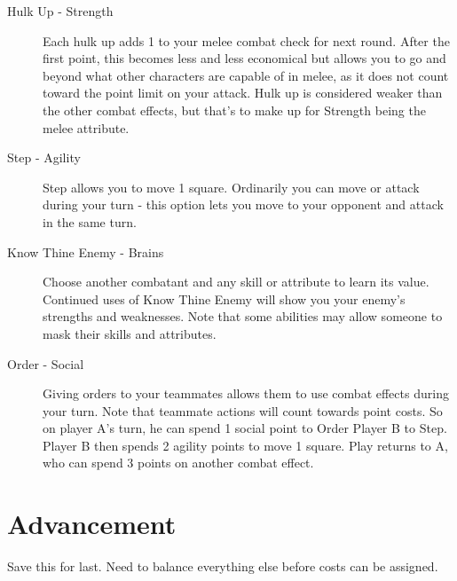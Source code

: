 \documentclass[twocolumn]{report}
\begin{document}
\begin{description}
\item[Hulk Up - Strength]
Each hulk up adds 1 to your melee combat check for next round.  After the first point, this becomes less and less economical but allows you to go and beyond what other characters are capable of in melee, as it does not count toward the point limit on your attack.  Hulk up is considered weaker than the other combat effects, but that's to make up for Strength being the melee attribute.

\item[Step - Agility]
Step allows you to move 1 square.  Ordinarily you can move or attack during your turn - this option lets you move to your opponent and attack in the same turn.

\item[Know Thine Enemy - Brains]
Choose another combatant and any skill or attribute to learn its value.  Continued uses of Know Thine Enemy will show you your enemy's strengths and weaknesses.  Note that some abilities may allow someone to mask their skills and attributes.

\item[Order - Social]
Giving orders to your teammates allows them to use combat effects during your turn.  Note that teammate actions will count towards point costs.  So on player A's turn, he can spend 1 social point to Order Player B to Step.  Player B then spends 2 agility points to move 1 square.  Play returns to A, who can spend 3 points on another combat effect.

\end{description}



\chapter{Advancement}

Save this for last.  Need to balance everything else before costs can be assigned.
\end{document}
